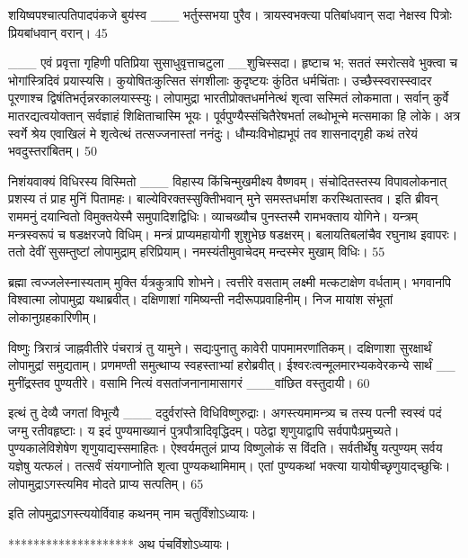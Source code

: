 शयिष्वपश्चात्पतिपादपंकजे बुय॑स्व
___ भर्तुस्सभया पुरैव।
त्रायस्वभक्त्या पतिबांधवान् सदा
नेक्षस्व पित्रोः प्रियबांधवान् वरान्।
45

___ एवं प्रवृत्ता गृहिणी पतिप्रिया सुसाधुवृत्ताचटुला
__शुचिस्सदा।
हृष्टाच भ; सततं स्मरोत्सवे भुक्त्वा च
भोगांस्त्रिदिवं प्रयास्यसि।
कुयोषितःकुत्सित संगशीलाः कुदृष्टयः
कुंठित धर्मचिंताः।
उच्छैस्स्वरास्स्वादर
पूरणाश्च द्विषंतिभर्तृन्नरकालयास्स्युः।
लोपामुद्रा भारतीप्रोक्तधर्मानेत्थं शृत्वा
सस्मितं लोकमाता।
सर्वान् कुर्वे मातरद्यत्वयोक्तान्
सर्वज्ञाहं शिक्षिताचास्मि भूयः।
पूर्वपुण्यैस्संचितैरेषभर्ता लब्धोभून्मे
मत्समाका हि लोके।
अत्र स्वर्गे श्रेय एवाखिलं मे शृत्वेत्थं
तत्सज्जनास्तां ननंदुः।
धौम्यःविभोह्यभूपं तव शासनाद्गृही
कथं तरेयं भवदुस्तरांबितम्।
50

निशंयवाक्यं विधिरस्य विस्मितो
___ विहास्य किंचिन्मुखमीक्ष्य वैष्णवम्।
संचोदितस्तस्य विपावलोकनात् प्रशस्य
तं प्राह मुनिं पितामहः।
बाल्येविरक्तस्सुक्तिीभवान् मुने
समस्तधर्माश करस्थितास्तव।
इति ब्रीवन् राममनुं दयान्वितो
विमुक्तयेस्मै समुपादिशद्विधिः।
व्याचख्यौच पुनस्तस्मै रामभक्ताय योगिने।
यन्त्रम् मन्त्रस्वरूपं च षडक्षरजपे विधिम्।
मन्त्रं प्राप्यमहायोगी शुशुभेछ षडक्षरम्।
बलायतिबलांचैव रघुनाथ इवापरः।
ततो देवीं सुसम्तुष्टां लोपामुद्राम् हरिप्रियाम्।
नमस्यंतीमुवाचेदम् मन्दस्मेर मुखाम् विधिः।
55


ब्रह्मा
त्वज्जलेस्नास्यताम् मुक्ति र्यत्रकुत्रापि शोभने।
त्वत्तीरे वसताम् लक्ष्मी मत्कटाक्षेण वर्धताम्।
भगवानपि विश्वात्मा लोपामुद्रा यथाब्रवीत्।
दक्षिणाशां गमिष्यन्ती नदीरूपप्रवाहिनीम्।
निज मायांश संभूतां लोकानुग्रहकारिणीम्।

विष्णुः
त्रिरात्रं जाह्नवीतीरे पंचरात्रं तु यामुने।
सद्यःपुनातु कावेरी पापमामरणांतिकम्।
दक्षिणाशा सुरक्षार्थं लोपामुद्रां समुद्यताम्।
प्रणमण्ती समुत्थाप्य स्वहस्ताभ्यां हरोब्रवीत्।
ईश्वरःत्वन्मूलमारभ्यकवेरकन्ये सार्थं
__ मुनींद्रस्तव पुण्यतीरे।
वसामि नित्यं वसतांजनानामासागरं
___वांछित वस्तुदायी।
60

इत्थं तु देव्यै जगतां विभूत्यै
___ ददुर्वरांस्ते विधिविष्णुरुद्राः।
अगस्त्यमामन्त्र्य च तस्य पत्नी स्वस्वं
पदं जग्मु रतीवहृष्टाः।
य इदं पुण्यमाख्यानं पुत्रपौत्रादिवृद्धिदम्।
पठेद्वा शृणुयाद्वापि सर्वपापैःप्रमुच्यते।
पुण्यकालेविशेषेण शृणुयाद्यस्समाहितः।
ऐश्वर्यमतुलं प्राप्य विष्णुलोकं स विंदति।
सर्वतीर्थेषु यत्पुण्यम् सर्वय यज्ञेषु यत्फलं।
तत्सर्वं संयगाप्नोति शृत्वा पुण्यकथामिमाम्।
एतां पुण्यकथां भक्त्या यायोषीच्छृणुयाद्च्छुचिः।
लोपामुद्राऽगस्त्यमिव मोदते प्राप्य सत्पतिम्।
65


इति लोपमुद्राऽगस्त्ययोर्विवाह कथनम् नाम
चतुर्विंशोऽध्यायः।

********************
अथ पंचविंशोऽध्यायः।

